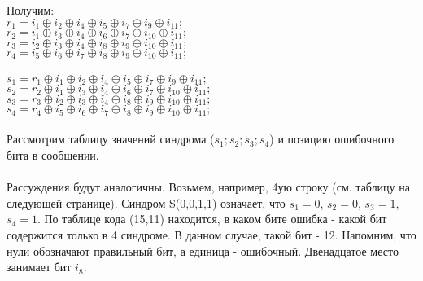 Получим: 
\\$r_1 = i_1 \oplus i_2 \oplus i_4  \oplus i_5  \oplus i_7  \oplus i_9  \oplus i_{11};$ 
\\$r_2 = i_1 \oplus i_3 \oplus i_4  \oplus i_6  \oplus i_7  \oplus i_{10}  \oplus i_{11};$
\\$r_3 = i_2 \oplus i_3 \oplus i_4  \oplus i_8  \oplus i_9  \oplus i_{10}  \oplus i_{11};$
\\$r_4 = i_5 \oplus i_6 \oplus i_7  \oplus i_8  \oplus i_9  \oplus i_{10}  \oplus i_{11};$
\\
\\$s_1 = r_1 \oplus i_1 \oplus i_2 \oplus i_4  \oplus i_5  \oplus i_7  \oplus i_9  \oplus i_{11};$
\\$s_2 = r_2 \oplus i_1 \oplus i_3 \oplus i_4 \oplus i_6  \oplus i_7  \oplus i_{10}  \oplus i_{11};$
\\$s_3 = r_3 \oplus i_2 \oplus i_3 \oplus i_4 \oplus i_8  \oplus i_9  \oplus i_{10}  \oplus i_{11};$
\\$s_4 = r_4 \oplus i_5 \oplus i_6 \oplus i_7  \oplus i_8  \oplus i_9  \oplus i_{10}  \oplus i_{11};$
\\
\\Рассмотрим таблицу значений синдрома ($s_1;s_2;s_3;s_4$) и позицию ошибочного бита в сообщении. \\\\
Рассуждения будут аналогичны. Возьмем, например, 4ую строку (см. таблицу на следующей странице). Синдром S(0,0,1,1) означает, что $s_1 = 0$, $s_2 = 0$, $s_3 = 1$, $s_4 = 1$. По таблице кода (15,11) находится, в каком бите ошибка - какой бит содержится только в 4 синдроме. В данном случае, такой бит - 12. Напомним, что нули обозначают правильный бит, а единица - ошибочный. Двенадцатое место занимает бит $i_8$.

